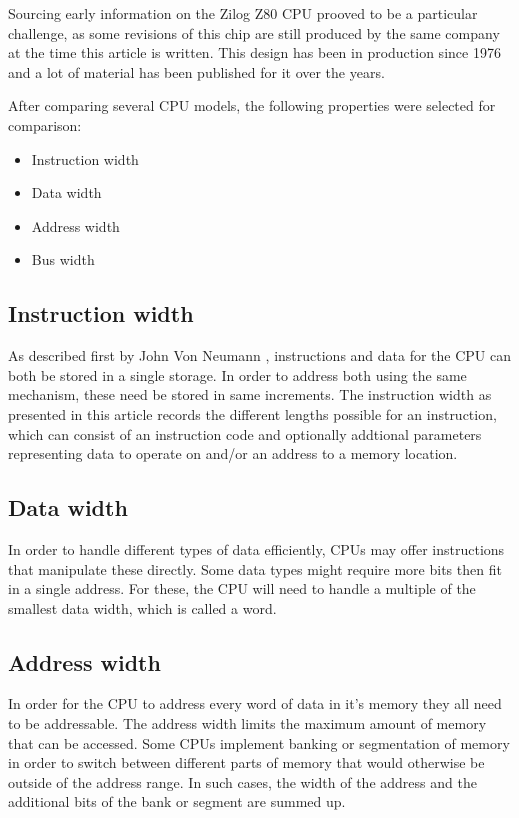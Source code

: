 \documentclass[twoside,twocolumn]{article}
\begin{document}
Sourcing early information on the Zilog Z80 CPU prooved to be a particular challenge, as
some revisions of this chip are still produced by the same company at the time this
article is written. This design has been in production since 1976 and a lot of material
has been published for it over the years.

After comparing several CPU models, the following properties were selected for comparison:

\begin{itemize}
\item Instruction width
\item Data width
\item Address width
\item Bus width
\end{itemize}

\subsection{Instruction width}

As described first by John Von Neumann \cite{edvac}, instructions and data for the CPU
can both be stored in a single storage. In order to address both using the same
mechanism, these need be stored in same increments. The instruction width as presented
in this article records the different lengths possible for an instruction, which can
consist of an instruction code and optionally addtional parameters representing data to
operate on and/or an address to a memory location.

\subsection{Data width}

In order to handle different types of data efficiently, CPUs may offer instructions that
manipulate these directly. Some data types might require more bits then fit in a single
address. For these, the CPU will need to handle a multiple of the smallest data width,
which is called a word.

\subsection{Address width}

In order for the CPU to address every word of data in it's memory they all need to be
addressable. The address width limits the maximum amount of memory that can be accessed.
Some CPUs implement banking or segmentation of memory in order to switch between
different parts of memory that would otherwise be outside of the address range. In such
cases, the width of the address and the additional bits of the bank or segment are
summed up.
\end{document}
